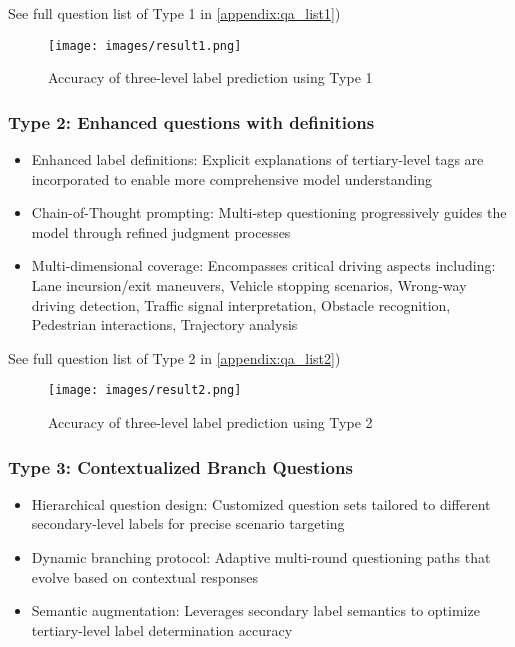 \documentclass[lettersize,journal]{IEEEtran}
\begin{document}
See full question list of Type 1 in \ref{appendix:qa_list1})

\begin{figure}
    \centering
    \texttt{[image: images/result1.png]}
    \caption{Accuracy of three-level label prediction using Type 1}
    \label{fig:3}
\end{figure}

\subsubsection{Type 2: Enhanced questions with definitions}
\begin{itemize}
    \item Enhanced label definitions: Explicit explanations of tertiary-level tags are incorporated to enable more comprehensive model understanding

    \item Chain-of-Thought prompting: Multi-step questioning progressively guides the model through refined judgment processes

    \item Multi-dimensional coverage: Encompasses critical driving aspects including: Lane incursion/exit maneuvers, Vehicle stopping scenarios, Wrong-way driving detection, Traffic signal interpretation, Obstacle recognition, Pedestrian interactions, Trajectory analysis
\end{itemize}

See full question list of Type 2 in \ref{appendix:qa_list2})

\begin{figure}
    \centering
    \texttt{[image: images/result2.png]}
    \caption{Accuracy of three-level label prediction using Type 2}
    \label{fig:4}
\end{figure}

\subsubsection{Type 3: Contextualized Branch Questions}
\begin{itemize}
    \item Hierarchical question design: Customized question sets tailored to different secondary-level labels for precise scenario targeting
    \item Dynamic branching protocol: Adaptive multi-round questioning paths that evolve based on contextual responses
    \item Semantic augmentation: Leverages secondary label semantics to optimize tertiary-level label determination accuracy
    
\end{itemize}
\end{document}
